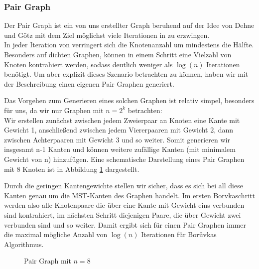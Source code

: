 \subsubsection{Pair Graph}
Der Pair Graph ist ein von uns erstellter Graph beruhend auf der Idee von Dehne und Götz \cite{dehne1998practical} mit dem Ziel möglichst viele Iterationen in \boruvkasAlgorithmus zu erzwingen.\\
In jeder Iteration von \boruvkasAlgorithmus verringert sich die Knotenanzahl um mindestens die Hälfte. Besonders auf dichten Graphen, können in einem Schritt eine Vielzahl von Knoten kontrahiert werden, sodass \boruvkasAlgorithmus deutlich weniger als $\log(n)$ Iterationen benötigt. Um aber explizit dieses Szenario betrachten zu können, haben wir mit der Beschreibung  einen eigenen Pair Graphen generiert.

Das Vorgehen zum Generieren eines solchen Graphen ist relativ simpel, besonders für uns, da wir nur Graphen mit $n = 2^k$ betrachten: \\
Wir erstellen zunächst zwischen jedem Zweierpaar an Knoten eine Kante mit Gewicht 1, anschließend zwischen jedem Viererpaaren mit Gewicht 2, dann zwischen Achterpaaren mit Gewicht 3 und so weiter. Somit generieren wir insgesamt n-1 Kanten und können weitere zufällige Kanten (mit minimalem Gewicht von n) hinzufügen. 
Eine schematische Darstellung eines Pair Graphen mit 8 Knoten ist in Abbildung \cref{Pair-Graph-Img} dargestellt.

Durch die geringen Kantengewichte stellen wir sicher, dass es sich bei all diese Kanten genau um die MST-Kanten des Graphen handelt. Im ersten Borvkaschritt werden also alle Knotenpaare die über eine Kante mit Gewicht eins verbunden sind kontrahiert, im nächsten Schritt diejenigen Paare, die über Gewicht zwei verbunden sind und so weiter. Damit ergibt sich für einen Pair Graphen immer die maximal mögliche Anzahl von $\log(n)$ Iterationen für Bor{\r u}vkas Algorithmus.

\begin{figure}[H]
    \centering
    
    \caption{Pair Graph mit $n=8$}
    \label{Pair-Graph-Img}
\end{figure}


